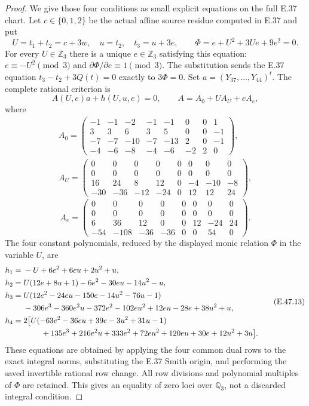 \begin{proof}
We give those four conditions as small explicit
equations on the full E.37 chart.  Let $c\in\{0,1,2\}$
be the actual affine source residue computed in
E.37 and put
\[
 U=t_1+t_2=c+3w,\quad u=t_2,\quad t_3=u+3e,
 \qquad \Phi=e+U^2+3Ue+9e^2=0.
 \tag{E.47.10a}
\]
For every $U\in\mathbb Z_3$ there is a unique
$e\in\mathbb Z_3$ satisfying this equation:
$e\equiv-U^2\pmod3$ and
$\partial\Phi/\partial e\equiv1\pmod3$.
The substitution sends the E.37 equation
$t_3-t_2+3Q(t)=0$ exactly to $3\Phi=0$.
Set $a=(Y_{37},\ldots,Y_{44})^t$.
The complete rational criterion is
\[
                         A(U,e)a+h(U,u,e)=0,
       \qquad A=A_0+U A_U+e A_e,
 \tag{E.47.10}
\]
where
\[
\begin{gathered}
 A_0=\begin{pmatrix}
 -1&-1&-2&-1&-1&0&0&1\\
 3&3&6&3&5&0&0&-1\\
 -7&-7&-10&-7&-13&2&0&-1\\
 -4&-6&-8&-4&-6&-2&2&0
 \end{pmatrix},\\[2pt]
 A_U=\begin{pmatrix}
 0&0&0&0&0&0&0&0\\0&0&0&0&0&0&0&0\\
 16&24&8&12&0&-4&-10&-8\\
 -30&-36&-12&-24&0&12&12&24
 \end{pmatrix},
\end{gathered}
 \tag{E.47.11}
\]
\[
 A_e=\begin{pmatrix}
 0&0&0&0&0&0&0&0\\0&0&0&0&0&0&0&0\\
 6&36&12&0&0&12&-24&24\\
 -54&-108&-36&-36&0&0&54&0
 \end{pmatrix}.
 \tag{E.47.12}
\]
The four constant polynomials, reduced by the
displayed monic relation $\Phi$ in the variable
$U$, are
\[
\begin{aligned}
 h_1={}&-U+6e^2+6eu+2u^2+u,\\
 h_2={}&U(12e+8u+1)-6e^2-30eu-14u^2-u,\\
 h_3={}&U(12e^2-24eu-150e-14u^2-76u-1)\\
       &-306e^3-360e^2u-372e^2-102eu^2
                       +12eu-28e+38u^2+u,\\
 h_4={}&2\bigl[U(-63e^2-36eu+39e-3u^2+31u-1)\\
       &\hspace{8mm}+135e^3+216e^2u+333e^2+72eu^2
                       +120eu+30e+12u^2+3u\bigr].
\end{aligned}
 \tag{E.47.13}
\]
These equations are obtained by applying the
four common dual rows to the exact integral
norms, substituting the E.37 Smith origin, and
performing the saved invertible rational row
change.  All row divisions and polynomial
multiples of $\Phi$ are retained.  This gives
an equality of zero loci over $\mathbb Q_3$,
not a discarded integral condition.


\end{proof}
